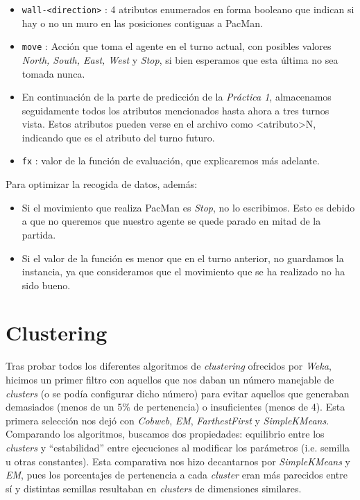 \documentclass[12pt]{article}
\begin{document}
\begin{itemize}
    \item \texttt{wall-\textless direction\textgreater} : 4 atributos enumerados en forma booleano que indican si hay o no un muro en las posiciones contiguas a PacMan.
    \item \texttt{move} : Acción que toma el agente en el turno actual, con posibles valores \textit{North, South, East, West} y \textit {Stop}, si bien esperamos que esta última no sea tomada nunca.
    \item En continuación de la parte de predicción de la \textit{Práctica 1}, almacenamos seguidamente todos los atributos mencionados hasta ahora a tres turnos vista. Estos atributos pueden verse en el archivo como \textless atributo\textgreater N, indicando que es el atributo del turno futuro.
    \item \texttt{fx} : valor de la función de evaluación, que explicaremos más adelante.
\end{itemize}

\noindent Para optimizar la recogida de datos, además:
\begin{itemize}
    \item Si el movimiento que realiza PacMan es \textit{Stop}, no lo escribimos. Esto es debido a que no queremos que nuestro agente se quede parado en mitad de la partida.
    \item Si el valor de la función es menor que en el turno anterior, no guardamos la instancia, ya que consideramos que el movimiento que se ha realizado no ha sido bueno.
\end{itemize}

\section{Clustering}


Tras probar todos los diferentes algoritmos de \textit{clustering} ofrecidos por \textit{Weka}, hicimos un primer filtro con aquellos que nos daban un número manejable de \textit{clusters} (o se podía configurar dicho número) para evitar aquellos que generaban demasiados (menos de un 5\% de pertenencia) o insuficientes (menos de 4). Esta primera selección nos dejó con \textit{Cobweb}, \textit{EM}, \textit{FarthestFirst} y \textit{SimpleKMeans}. Comparando los algoritmos, buscamos dos propiedades: equilibrio entre los \textit{clusters} y ``estabilidad'' entre ejecuciones al modificar los parámetros (i.e. semilla u otras constantes). Esta comparativa nos hizo decantarnos por \textit{SimpleKMeans} y \textit{EM}, pues los porcentajes de pertenencia a cada \textit{cluster} eran más parecidos entre sí y distintas semillas resultaban en \textit{clusters} de dimensiones similares.
\end{document}
